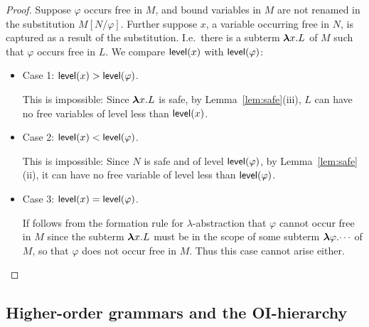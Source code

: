 \begin{proof} Suppose $\varphi$ occurs free in $M$, and
bound variables in $M$ are not renamed in the substitution $M[N /
\varphi]$. Further suppose $x$, a variable occurring free in $N$,
is captured as a result of the substitution. I.e.~there is a
subterm ${\hbox{\boldmath $\lambda$}{x}.{L}}$ of $M$ such that $\varphi$ occurs free in
$L$. We compare ${\sf level}(x)$ with ${\sf level}(\varphi)$:

\begin{itemize}
\item {Case 1}: ${\sf level}(x) > {\sf level}(\varphi)$.

This is impossible: Since ${\hbox{\boldmath $\lambda$}{x}.{L}}$ is safe, by
Lemma~\ref{lem:safe}(iii), $L$ can have no free variables of level
less than ${\sf level}(x)$.

\item {Case 2}: ${\sf level}(x) < {\sf level}(\varphi)$.

This is impossible: Since $N$ is safe and of level
${\sf level}(\varphi)$, by Lemma~\ref{lem:safe}(ii), it can have no
free variable of level less than ${\sf level}(\varphi)$.

\item {Case 3}: ${\sf level}(x) = {\sf level}(\varphi)$.

If follows from the formation rule for $\lambda$-abstraction that
$\varphi$ cannot occur free in $M$ since the subterm
${\hbox{\boldmath $\lambda$}{x}.{L}}$ must be in the scope of some subterm
${\hbox{\boldmath $\lambda$}{\varphi}.{\cdots}}$ of $M$, so that $\varphi$ does not occur free
in $M$. Thus this case cannot arise either.
\end{itemize}

\end{proof}

\subsection{Higher-order grammars and the OI-hierarchy}

